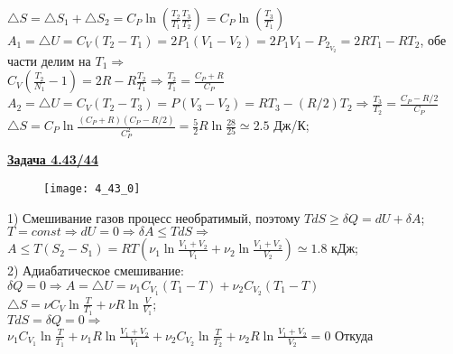 \documentclass[12pt]{article}
\begin{document}
$\triangle S=\triangle S_1+\triangle S_2=C_P\ln\left(\frac{T_2}{T_1}\frac{T_3}{T_2}\right)=C_P\ln\left(\frac{T_3}{T_1}\right) $\\

$A_1=\triangle U=C_V(T_2-T_1)=2P_1(V_1-V_2)=2P_1V_1-P_2_V_2=2RT_1-RT_2$, обе части делим на $T_1 \Rightarrow$\\

$C_V\left(\frac{T_2}{N_1}-1 \right)=2R-R\frac{T_2}{T_1}\Rightarrow \frac{T_2}{T_1}=\frac{C_P+R}{C_P}$\\ 

$A_2=\triangle U=C_V(T_2-T_3)=P(V_3-V_2)=RT_3-(R/2)T_2 \Rightarrow \frac{T_3}{T_2}=\frac{C_P-R/2}{C_P}$\\

$\triangle S=C_P\ln\frac{(C_P+R)(C_P-R/2)}{C_P^2}=\frac{5}{2}R\ln\frac{28}{25}\simeq2.5$ Дж/К;

\newpage


{\underline\bf Задача 4.43/44}


\begin{figure}[h]
\texttt{[image: 4\_43\_0]}
\end{figure}

\vspace{1cm}


1) Смешивание газов процесс необратимый, поэтому $TdS\geq \delta Q=dU+\delta A$;\\

$T=const\Rightarrow dU=0\Rightarrow \delta A\leq TdS \Rightarrow$\\

$A\leq T(S_2-S_1)=RT\left(\nu_1\ln\frac{V_1+V_2}{V_1}+\nu_2\ln\frac{V_1+V_2}{V_2}\right)\simeq1.8$ кДж;\\

2) Адиабатическое смешивание: \\

$\delta Q=0 \Rightarrow A=\triangle U=\nu_1C_{V_1}(T_1-T)+\nu_2C_{V_2}(T_1-T)$\\

$\triangle S=\nu C_V\ln\frac{T}{T_1}+\nu R\ln\frac{V}{V_1}$;\\

$TdS=\delta Q=0 \Rightarrow$\\

$\nu_1C_{V_1}\ln\frac{T}{T_1}+\nu_1 R\ln\frac{V_1+V_2}{V_1}+\nu_2C_{V_2}\ln\frac{T}{T_2}+\nu_2 R\ln\frac{V_1+V_2}{V_2}=0$ Откуда\\
\end{document}
